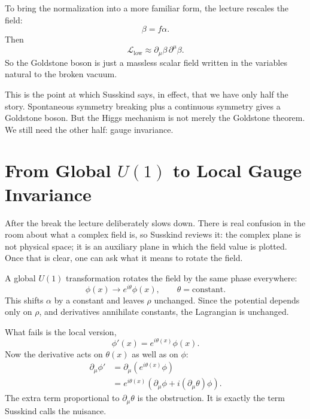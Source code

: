 To bring the normalization into a more familiar form, the lecture rescales the field:
\begin{equation}
\beta = f\alpha.
\end{equation}
Then
\begin{equation}
\mathcal L_{\mathrm{low}}
\approx
\partial_\mu\beta\,\partial^\mu\beta.
\end{equation}
So the Goldstone boson is just a massless scalar field written in the variables natural to the broken vacuum.

This is the point at which Susskind says, in effect, that we have only half the story. Spontaneous symmetry breaking plus a continuous symmetry gives a Goldstone boson. But the Higgs mechanism is not merely the Goldstone theorem. We still need the other half: gauge invariance.

\section{From Global \(U(1)\) to Local Gauge Invariance}

After the break the lecture deliberately slows down. There is real confusion in the room about what a complex field is, so Susskind reviews it: the complex plane is not physical space; it is an auxiliary plane in which the field value is plotted. Once that is clear, one can ask what it means to rotate the field.

A global \(U(1)\) transformation rotates the field by the same phase everywhere:
\begin{equation}
\phi(x)\to e^{i\theta}\phi(x),
\qquad
\theta=\text{constant}.
\end{equation}
This shifts \(\alpha\) by a constant and leaves \(\rho\) unchanged. Since the potential depends only on \(\rho\), and derivatives annihilate constants, the Lagrangian is unchanged.

What fails is the local version,
\begin{equation}
\phi'(x)=e^{i\theta(x)}\phi(x).
\end{equation}
Now the derivative acts on \(\theta(x)\) as well as on \(\phi\):
\begin{align}
\partial_\mu\phi'
&=
\partial_\mu\!\left(e^{i\theta(x)}\phi\right) \\
&=
e^{i\theta(x)}
\left(
\partial_\mu\phi+i(\partial_\mu\theta)\phi
\right).
\end{align}
The extra term proportional to \(\partial_\mu\theta\) is the obstruction. It is exactly the term Susskind calls the nuisance.

